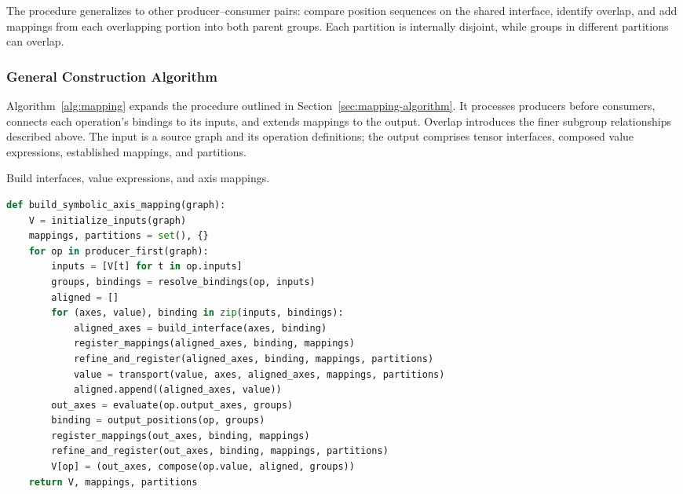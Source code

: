 The procedure generalizes to other producer--consumer pairs: compare position
sequences on the shared interface, identify overlap, and add mappings from
each overlapping portion into both parent groups. Each partition is internally
disjoint, while groups in different partitions can overlap.


\subsubsection{General Construction Algorithm}
\label{extended:sec:mapping-algorithm}
Algorithm~\ref{alg:mapping} expands the procedure outlined in
Section~\ref{sec:mapping-algorithm}. It processes producers before consumers, connects each
operation's bindings to its inputs, and extends mappings to the output.
Overlap introduces the finer subgroup relationships described above.
The input is a source graph and its operation definitions; the output comprises
tensor interfaces, composed value expressions, established mappings,
and partitions.

\begin{paperalgorithm}[H]
\caption{Build interfaces, value expressions, and axis mappings.}
\label{alg:mapping}
\begin{lstlisting}[language=Python]
def build_symbolic_axis_mapping(graph):
    V = initialize_inputs(graph)
    mappings, partitions = set(), {}
    for op in producer_first(graph):
        inputs = [V[t] for t in op.inputs]
        groups, bindings = resolve_bindings(op, inputs)
        aligned = []
        for (axes, value), binding in zip(inputs, bindings):
            aligned_axes = build_interface(axes, binding)
            register_mappings(aligned_axes, binding, mappings)
            refine_and_register(aligned_axes, binding, mappings, partitions)
            value = transport(value, axes, aligned_axes, mappings, partitions)
            aligned.append((aligned_axes, value))
        out_axes = evaluate(op.output_axes, groups)
        binding = output_positions(op, groups)
        register_mappings(out_axes, binding, mappings)
        refine_and_register(out_axes, binding, mappings, partitions)
        V[op] = (out_axes, compose(op.value, aligned, groups))
    return V, mappings, partitions
\end{lstlisting}
\end{paperalgorithm}

